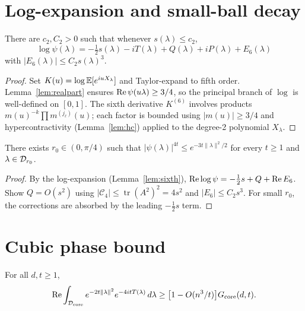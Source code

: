 \section{Log-expansion and small-ball decay}

\begin{lemma}\label{lem:sixth}
\leanok
{}
There are $c_2,C_2>0$ such that whenever $s(\lambda)\le c_2$,
\[
  \log\psi(\lambda)
  =-\tfrac12 s(\lambda)-iT(\lambda)+Q(\lambda)+iP(\lambda)+E_6(\lambda)
\]
with $|E_6(\lambda)|\le C_2 s(\lambda)^3$.
\end{lemma}

\begin{proof}\leanok
{}
Set $K(u)=\log\mathbb{E}[e^{iuX_\lambda}]$ and Taylor-expand to fifth order.
Lemma~\ref{lem:realpart} ensures $\operatorname{Re}\psi(u\lambda)\ge 3/4$,
so the principal branch of $\log$ is well-defined on $[0,1]$.
The sixth derivative $K^{(6)}$ involves products $m(u)^{-k}\prod m^{(j_\ell)}(u)$;
each factor is bounded using $|m(u)|\ge 3/4$ and hypercontractivity
(Lemma~\ref{lem:hc}) applied to the degree-2 polynomial $X_\lambda$.
\end{proof}

\begin{lemma}\label{lem:small-ball}
\leanok
{}
There exists $r_0\in(0,\pi/4)$ such that
$|\psi(\lambda)|^{4t}\le e^{-3t\|\lambda\|^2/2}$
for every $t\ge 1$ and $\lambda\in\mathcal{D}_{r_0}$.
\end{lemma}

\begin{proof}\leanok
{}
By the log-expansion (Lemma~\ref{lem:sixth}),
$\operatorname{Re}\log\psi=-\frac12 s+Q+\operatorname{Re} E_6$.
Show $Q=O(s^2)$ using $|\mathcal{C}_4|\le \operatorname{tr}(A^2)^2=4s^2$
and $|E_6|\le C_2 s^3$. For small $r_0$, the corrections are absorbed
by the leading $-\frac12 s$ term.
\end{proof}

\section{Cubic phase bound}

\begin{lemma}\label{lem:cubic}
\leanok
{}
For all $d,t\ge 1$,
\[
  \operatorname{Re}\int_{\mathcal{D}_\mathrm{core}}e^{-2t\|\lambda\|^2}e^{-4itT(\lambda)}\,d\lambda
  \ge \bigl[1-O(n^3/t)\bigr]G_{\mathrm{core}}(d,t).
\]
\end{lemma}

